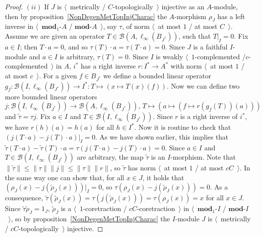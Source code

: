 \begin{proof}
$(ii)$ If $J$ is $\langle$~metrically / $C$-topologically~$\rangle$ injective as
an $A$-module, then by proposition~\ref{NonDegenMetTopInjCharac} the $A$-morphism
$\rho_J$ has a left inverse in $\langle$~$\mathbf{mod}_1\text{-}A$ /
$\mathbf{mod}\text{-}A$~$\rangle$, say $\tau $, of norm $\langle$~at most $1$ / at most
$C$~$\rangle$. Assume we are given an operator $T\in
\mathcal{B}(A,\ell_\infty(B_{J^*}))$, such that $T|_I=0$. Fix $a\in I$; then
$T\cdot a=0$, and so $\tau (T)\cdot a=\tau (T\cdot a)=0$. Since $J$ is a faithful
$I$-module and $a\in I$ is arbitrary, $\tau (T)=0$. Since $I$ is weakly 
$\langle$~$1$-complemented /$c$-complemented~$\rangle$ in $A$, $i^*$ has a right 
inverse $r:I^*\to A^*$ with norm $\langle$~at most $1$ / at most $c$~$\rangle$.
For a given $f\in B_{J^*}$ we define a bounded linear operator 
$g_f:\mathcal{B}(I,\ell_\infty(B_{J^*}))\to I^*:T\mapsto(x\mapsto T(x)(f))$. 
Now we can define two more bounded linear operators
\[
j:
\mathcal{B}(I,\ell_\infty(B_{J^*}))\to \mathcal{B}(A,\ell_\infty(B_{J^*})),\,
T\mapsto (a\mapsto (f\mapsto r(g_{f}(T))(a)))
\] 
and $\widetilde{\tau}=\tau  j$. Fix $a\in I$ 
and $T\in\mathcal{B}(I,\ell_\infty(B_{J^*}))$. Since $r$ is a right inverse 
of $i^*$, we have $r(h)(a)=h(a)$ for all $h\in I^*$. Now it is routine to check 
that $(j(T\cdot a)-j(T)\cdot a)|_I=0$. As we have shown earlier, this implies
that $\widetilde{\tau}(T\cdot a)-\widetilde{\tau}(T)\cdot a
=\tau (j(T\cdot a)-j(T)\cdot a)=0$. Since $a\in I$ 
and $T\in\mathcal{B}(I,\ell_\infty(B_{J^*}))$ are arbitrary, the 
map $\widetilde{\tau}$ is an $I$-morphism.
Note that 
$\lVert\widetilde{\tau}\rVert\leq\lVert\tau \rVert\lVert j\rVert\leq \lVert
\tau\rVert\lVert r\rVert$, so $\widetilde{\tau}$ has 
norm $\langle$~at most $1$ / at most $cC$~$\rangle$.
In the same way one can show that, for all $x\in J$, 
it holds that $(\rho_J(x)-j(\widetilde{\rho}_J(x)))|_I=0$,
so $\tau (\rho_J(x)-j(\widetilde{\rho}_J(x)))=0$. As a consequence,
$\widetilde{\tau}(\widetilde{\rho}_J(x))
=\tau (j(\widetilde{\rho}_J(x)))=\tau(\rho_J(x))=x$ 
for all $x\in J$. Since $\widetilde{\tau}\widetilde{\rho}_J=1_J$,
$\widetilde{\rho}_J$ is a  $\langle$~$1$-coretraction /
$cC$-coretraction~$\rangle$ in $\langle$~$\mathbf{mod}_1\text{-}I$ /
$\mathbf{mod}\text{-}I$~$\rangle$, so by proposition~\ref{NonDegenMetTopInjCharac} the
$I$-module $J$ is $\langle$~metrically / $cC$-topologically~$\rangle$ injective.
\end{proof}


